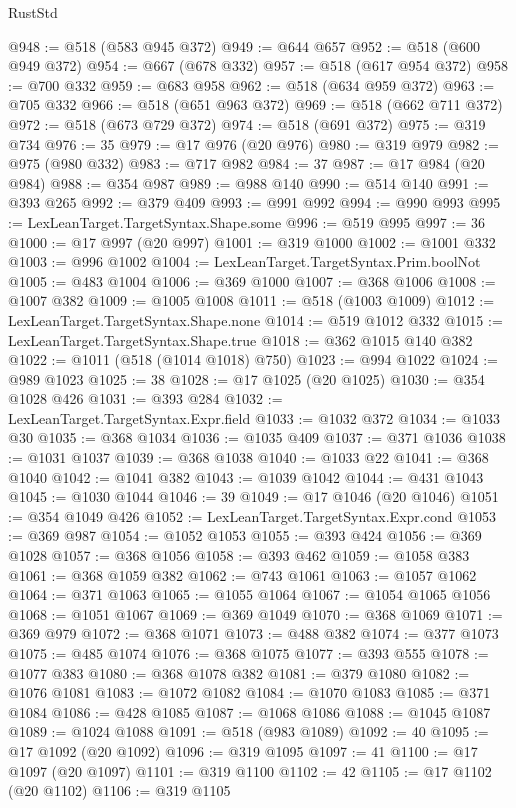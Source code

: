 \begin{lexlean}{RustStd}
\begin{coremodule}
@948 := @518 (@583 @945 @372)
@949 := @644 @657
@952 := @518 (@600 @949 @372)
@954 := @667 (@678 @332)
@957 := @518 (@617 @954 @372)
@958 := @700 @332
@959 := @683 @958
@962 := @518 (@634 @959 @372)
@963 := @705 @332
@966 := @518 (@651 @963 @372)
@969 := @518 (@662 @711 @372)
@972 := @518 (@673 @729 @372)
@974 := @518 (@691 @372)
@975 := @319 @734
@976 := 35
@979 := @17 @976 (@20 @976)
@980 := @319 @979
@982 := @975 (@980 @332)
@983 := @717 @982
@984 := 37
@987 := @17 @984 (@20 @984)
@988 := @354 @987
@989 := @988 @140
@990 := @514 @140
@991 := @393 @265
@992 := @379 @409
@993 := @991 @992
@994 := @990 @993
@995 := LexLeanTarget.TargetSyntax.Shape.some
@996 := @519 @995
@997 := 36
@1000 := @17 @997 (@20 @997)
@1001 := @319 @1000
@1002 := @1001 @332
@1003 := @996 @1002
@1004 := LexLeanTarget.TargetSyntax.Prim.boolNot
@1005 := @483 @1004
@1006 := @369 @1000
@1007 := @368 @1006
@1008 := @1007 @382
@1009 := @1005 @1008
@1011 := @518 (@1003 @1009)
@1012 := LexLeanTarget.TargetSyntax.Shape.none
@1014 := @519 @1012 @332
@1015 := LexLeanTarget.TargetSyntax.Shape.true
@1018 := @362 @1015 @140 @382
@1022 := @1011 (@518 (@1014 @1018) @750)
@1023 := @994 @1022
@1024 := @989 @1023
@1025 := 38
@1028 := @17 @1025 (@20 @1025)
@1030 := @354 @1028 @426
@1031 := @393 @284
@1032 := LexLeanTarget.TargetSyntax.Expr.field
@1033 := @1032 @372
@1034 := @1033 @30
@1035 := @368 @1034
@1036 := @1035 @409
@1037 := @371 @1036
@1038 := @1031 @1037
@1039 := @368 @1038
@1040 := @1033 @22
@1041 := @368 @1040
@1042 := @1041 @382
@1043 := @1039 @1042
@1044 := @431 @1043
@1045 := @1030 @1044
@1046 := 39
@1049 := @17 @1046 (@20 @1046)
@1051 := @354 @1049 @426
@1052 := LexLeanTarget.TargetSyntax.Expr.cond
@1053 := @369 @987
@1054 := @1052 @1053
@1055 := @393 @424
@1056 := @369 @1028
@1057 := @368 @1056
@1058 := @393 @462
@1059 := @1058 @383
@1061 := @368 @1059 @382
@1062 := @743 @1061
@1063 := @1057 @1062
@1064 := @371 @1063
@1065 := @1055 @1064
@1067 := @1054 @1065 @1056
@1068 := @1051 @1067
@1069 := @369 @1049
@1070 := @368 @1069
@1071 := @369 @979
@1072 := @368 @1071
@1073 := @488 @382
@1074 := @377 @1073
@1075 := @485 @1074
@1076 := @368 @1075
@1077 := @393 @555
@1078 := @1077 @383
@1080 := @368 @1078 @382
@1081 := @379 @1080
@1082 := @1076 @1081
@1083 := @1072 @1082
@1084 := @1070 @1083
@1085 := @371 @1084
@1086 := @428 @1085
@1087 := @1068 @1086
@1088 := @1045 @1087
@1089 := @1024 @1088
@1091 := @518 (@983 @1089)
@1092 := 40
@1095 := @17 @1092 (@20 @1092)
@1096 := @319 @1095
@1097 := 41
@1100 := @17 @1097 (@20 @1097)
@1101 := @319 @1100
@1102 := 42
@1105 := @17 @1102 (@20 @1102)
@1106 := @319 @1105

\end{coremodule}
\end{lexlean}
